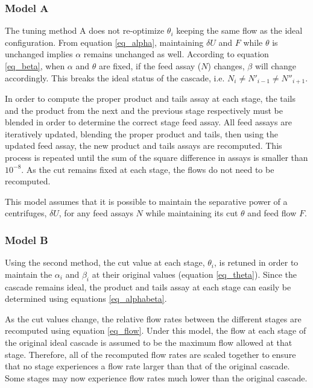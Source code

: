 \subsubsection{Model A}

The tuning method A does not re-optimize $\theta_i$ keeping the same flow as the
ideal configuration. From equation \eqref{eq_alpha}, maintaining $\delta U$ and
$F$ while $\theta$ is unchanged implies $\alpha$ remains unchanged as well.
According to equation \eqref{eq_beta}, when $\alpha$ and $\theta$ are fixed, if
the feed assay ($N$) changes, $\beta$ will change accordingly.  This breaks the
ideal status of the cascade, i.e. $N_{i} \neq N'_{i-1} \neq N''_{i+1}$.


In order to compute the proper product and tails assay at each stage, the tails
and the product from the next and the previous stage respectively must be
blended in order to determine the correct stage feed assay. All feed assays are
iteratively updated, blending the proper product and tails, then using the
updated feed assay, the new product and tails assays are recomputed. This
process is repeated until the sum of the square difference in assays is smaller
than $10^{-8}$.  As the cut remains fixed at each stage, the flows do not need
to be recomputed.

This model assumes that it is possible to maintain the separative power of a
centrifuges, $\delta U$, for any feed assays $N$ while maintaining its cut
$\theta$ and feed flow $F$.

\subsubsection{Model B}

Using the second method, the cut value at each stage, $\theta_i$, is retuned in
order to maintain the $\alpha_i$ and $\beta_i$ at their original values
(equation \eqref{eq_theta}). Since the cascade remains ideal, the product and
tails assay at each stage can easily be determined using equations
\eqref{eq_alphabeta}.

As the cut values change, the relative flow rates between the different stages
are recomputed using equation \eqref{eq_flow}.  Under this model, the flow at
each stage of the original ideal cascade is assumed to be the maximum flow
allowed at that stage.  Therefore, all of the recomputed flow rates are scaled
together to ensure that no stage experiences a flow rate larger than that of
the original cascade.  Some stages may now experience flow rates much lower
than the original cascade.

